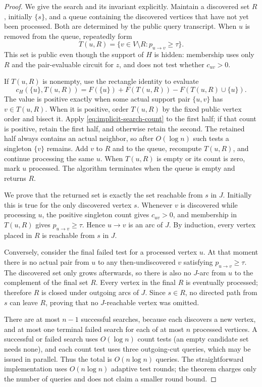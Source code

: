 \documentclass[11pt]{article}
\theoremstyle{definition}
\newcommand{\cH}{c_H}
\begin{document}
\begin{proof}
We give the search and its invariant explicitly.  Maintain a discovered set
$R$, initially $\{s\}$, and a queue containing the discovered vertices that
have not yet been processed.  Both are determined by the public query
transcript.  When $u$ is removed from the queue, repeatedly form
\[
 T(u,R)=\{v\in V\setminus R:p_{u\to v}\ge\tau\}.
\]
This set is public even though the support of $H$ is hidden: membership uses
only $R$ and the pair-evaluable circuit for $z$, and does not test whether
$c_{uv}>0$.

If $T(u,R)$ is nonempty, use the rectangle identity to evaluate
\begin{equation}\label{eq:implicit-search-count}
 \cH(\{u\},T(u,R))
 =F(\{u\})+F(T(u,R))-F(T(u,R)\cup\{u\}).
\end{equation}
The value is positive exactly when some actual support pair $\{u,v\}$ has
$v\in T(u,R)$.  When it is positive, order $T(u,R)$ by the fixed public
vertex order and bisect it.  Apply
\eqref{eq:implicit-search-count} to the first half; if that count is
positive, retain the first half, and otherwise retain the second.  The
retained half always contains an actual neighbor, so after
$O(\log n)$ such tests a singleton $\{v\}$ remains.  Add $v$ to $R$ and to
the queue, recompute $T(u,R)$, and continue processing the same $u$.  When
$T(u,R)$ is empty or its count is zero, mark $u$ processed.  The algorithm
terminates when the queue is empty and returns $R$.

We prove that the returned set is exactly the set reachable from $s$ in
$J$.  Initially this is true for the only discovered vertex $s$.  Whenever
$v$ is discovered while processing $u$, the positive singleton count gives
$c_{uv}>0$, and membership in $T(u,R)$ gives
$p_{u\to v}\ge\tau$.  Hence $u\to v$ is an arc of $J$.  By induction, every
vertex placed in $R$ is reachable from $s$ in $J$.

Conversely, consider the final failed test for a processed vertex $u$.  At
that moment there is no actual pair from $u$ to any then-undiscovered
$v$ satisfying $p_{u\to v}\ge\tau$.  The discovered set only grows
afterwards, so there is also no $J$-arc from $u$ to the complement of the
final set $R$.  Every vertex in the final $R$ is eventually processed;
therefore $R$ is closed under outgoing arcs of $J$.  Since $s\in R$, no
directed path from $s$ can leave $R$, proving that no $J$-reachable vertex
was omitted.

There are at most $n-1$ successful searches, because each discovers a new
vertex, and at most one terminal failed search for each of at most $n$
processed vertices.  A successful or failed search uses
$O(\log n)$ count tests (an empty candidate set needs none), and each count
test uses three outgoing-cut queries, which may be issued in parallel.
Thus the total is $O(n\log n)$ queries.  The straightforward implementation
uses $O(n\log n)$ adaptive test rounds; the theorem charges only the number
of queries and does not claim a smaller round bound.
\end{proof}
\end{document}
